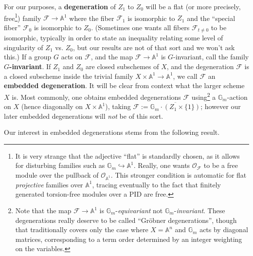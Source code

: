 \documentclass[10pt,a4paper]{amsart}
\newtheorem{proposition}[Thm]{Proposition}
\newcommand\defn[1]{{\bf #1}}
\def\AA{{\mathbb A }}
\newcommand\calO{{\mathcal O}}
\newcommand\calF{{\mathcal F}}
\newcommand\Gm{{\mathbb G}_m}
\renewcommand\AA{{\mathbb A}}
\newcommand\into\hookrightarrow
\newcommand\junk[1]{}
\begin{document}
For our purposes, a \textbf{degeneration} of $Z_1$ to $Z_0$ will be a flat
(or more precisely, free\footnote{%
  It is very strange that the adjective ``flat'' is standardly chosen,
  as it allows for disturbing families such as $\Gm \into \AA^1$.
  Really, one wants $\calO_\calF$ to be a free module over the
  pullback of $\calO_{\AA^1}$. This stronger condition is automatic for
  flat {\em projective} families over $\AA^1$, tracing eventually to the fact that
  finitely generated torsion-free modules over a PID are free.})
family $\calF \to \mathbb{A}^1$ where the fiber
$\calF_1$ is isomorphic to $Z_1$ and the ``special fiber''
$\calF_0$ is isomorphic to $Z_0$. (Sometimes one wants all
fibers $\calF_{t\neq 0}$ to be isomorphic, typically in order to state
an inequality relating some level of singularity of $Z_1$ vs. $Z_0$,
but our results are not of that sort and we won't ask this.)
If a group $G$ acts on $\calF$, and the map $\calF\to\AA^1$ is $G$-invariant,
call the family \defn{$G$-invariant}.
If $Z_1$ and $Z_0$ are closed subschemes of $X$,
and the degeneration $\calF$ is a closed subscheme inside the trivial family
$X \times \AA^1 \to \AA^1$, we call $\calF$ an \defn{embedded degeneration}. It will be clear from context what the larger scheme $X$ is.
Most commonly, one obtains embedded degenerations $\calF$ using\footnote{%
  Note that the map $\calF \to \AA^1$ is $\Gm$-{\em equivariant} not
  $\Gm$-{\em invariant}. 
  These degenerations really deserve to be called ``Gr\"obner degenerations'',
  though that traditionally covers only the case where $X = \AA^n$
  and $\Gm$ acts by diagonal matrices, corresponding to a term order
  determined by an integer weighting on the variables.}
a $\Gm$-action on $X$ (hence diagonally on $X\times \AA^1$),
taking $\calF := \overline{\Gm\cdot (Z_1 \times \{1\})}$;
however our later embedded degenerations will {\em not} be of this sort.

Our interest in embedded degenerations stems from the following result.

\junk{
\begin{proposition}\label{prop:sameclass}
  Let $X$ be a projective scheme with two closed subschemes
  $Z_1$ and $Z_0$. If there is an embedded degeneration from $Z_1$ to $Z_0$,
  then
  \[[Z_1] = [Z_0] \quad \text{in $A_*(X)$ or $H_*(X)$}, \]
  and
  \[[\mathcal{O}_{Z_1}] = [\mathcal{O}_{Z_0}] \quad \text{in $K_0(X)$}.
    \qquad\qquad\quad
  \]
  If $\calF$ is a $G$-invariant degeneration, then the equalities hold also for
  the equivariant classes in $K^G_0(X),A_*^G(X),H_*^G(X)$.
\end{proposition}
}
\end{document}

